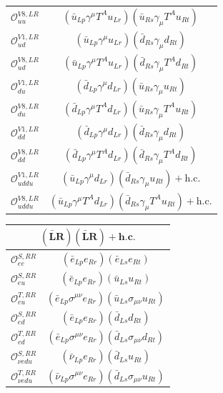 \begin{table}[htbp]
{\begin{tabular}[t]{c|c}
        $\mathcal{O}_{uu}^{V8,LR}$ & $(\bar{u}_{Lp} \gamma^\mu T^A u_{Lr})(\bar{u}_{Rs} \gamma_\mu T^A u_{Rt})$ \\
        $\mathcal{O}_{ud}^{V1,LR}$ & $(\bar{u}_{Lp} \gamma^\mu u_{Lr})(\bar{d}_{Rs} \gamma_\mu d_{Rt})$ \\
        $\mathcal{O}_{ud}^{V8,LR}$ & $(\bar{u}_{Lp} \gamma^\mu T^A u_{Lr})(\bar{d}_{Rs} \gamma_\mu T^A d_{Rt})$ \\
        $\mathcal{O}_{du}^{V1,LR}$ & $(\bar{d}_{Lp} \gamma^\mu d_{Lr})(\bar{u}_{Rs} \gamma_\mu u_{Rt})$ \\
        $\mathcal{O}_{du}^{V8,LR}$ & $(\bar{d}_{Lp} \gamma^\mu T^A d_{Lr})(\bar{u}_{Rs} \gamma_\mu T^A u_{Rt})$ \\
        $\mathcal{O}_{dd}^{V1,LR}$ & $(\bar{d}_{Lp} \gamma^\mu d_{Lr})(\bar{d}_{Rs} \gamma_\mu d_{Rt})$ \\
        $\mathcal{O}_{dd}^{V8,LR}$ & $(\bar{d}_{Lp} \gamma^\mu T^A d_{Lr})(\bar{d}_{Rs} \gamma_\mu T^A d_{Rt})$ \\
        $\mathcal{O}_{uddu}^{V1,LR}$ & $(\bar{u}_{Lp} \gamma^\mu d_{Lr})(\bar{d}_{Rs} \gamma_\mu u_{Rt}) + \text{h.c.}$ \\
        $\mathcal{O}_{uddu}^{V8,LR}$ & $(\bar{u}_{Lp} \gamma^\mu T^A d_{Lr})(\bar{d}_{Rs} \gamma_\mu T^A u_{Rt}) + \text{h.c.}$
    \end{tabular}
    \hspace{0.3em}
    \begin{tabular}[t]{c|c}
        \multicolumn{2}{c}{\textbf{$\boldsymbol{(\bar{L}R)(\bar{L}R) + \text{h.c.}}$}} \\ \hline
        $\mathcal{O}_{ee}^{S,RR}$ & $(\bar{e}_{Lp} e_{Rr})(\bar{e}_{Ls} e_{Rt})$ \\
        $\mathcal{O}_{eu}^{S,RR}$ & $(\bar{e}_{Lp} e_{Rr})(\bar{u}_{Ls} u_{Rt})$ \\
        $\mathcal{O}_{eu}^{T,RR}$ & $(\bar{e}_{Lp} \sigma^{\mu\nu} e_{Rr})(\bar{u}_{Ls} \sigma_{\mu\nu} u_{Rt})$ \\
        $\mathcal{O}_{ed}^{S,RR}$ & $(\bar{e}_{Lp} e_{Rr})(\bar{d}_{Ls} d_{Rt})$ \\
        $\mathcal{O}_{ed}^{T,RR}$ & $(\bar{e}_{Lp} \sigma^{\mu\nu} e_{Rr})(\bar{d}_{Ls} \sigma_{\mu\nu} d_{Rt})$ \\
        $\mathcal{O}_{\nu edu}^{S,RR}$ & $(\bar{\nu}_{Lp} e_{Rr})(\bar{d}_{Ls} u_{Rt})$ \\
        $\mathcal{O}_{\nu edu}^{T,RR}$ & $(\bar{\nu}_{Lp} \sigma^{\mu\nu} e_{Rr})(\bar{d}_{Ls} \sigma_{\mu\nu} u_{Rt})$ \\

\end{tabular}}
\end{table}
